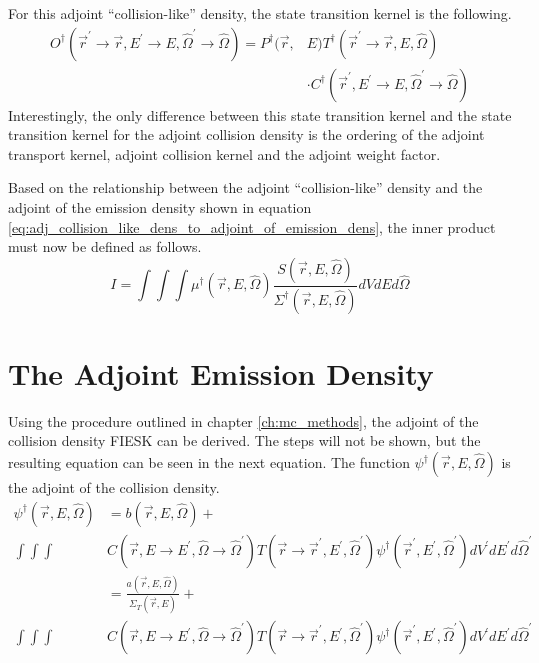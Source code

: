 For this adjoint ``collision-like'' density, the state transition kernel is the 
following. 
\begin{equation}
  \begin{split}
    O^{\dagger}(\vec{r}^{'} \to \vec{r},E^{'} \to E,\hat{\Omega}^{'} \to \hat{\Omega})
    = P^{\dagger}(\vec{r},&E) 
    T^{\dagger}(\vec{r}^{'} \to \vec{r},E,\hat{\Omega}) \\
    & \cdot C^{\dagger}(\vec{r}^{'},E^{'} \to E,\hat{\Omega}^{'} \to \hat{\Omega})
  \end{split}
\end{equation}
Interestingly, the only difference between this state transition
kernel and the state transition kernel for the adjoint collision density is
the ordering of the adjoint transport kernel, adjoint collision kernel and the
adjoint weight factor.

Based on the relationship between the adjoint ``collision-like'' density and the
adjoint of the emission density shown in equation 
\ref{eq:adj_collision_like_dens_to_adjoint_of_emission_dens}, the inner product
must now be defined as follows.
\begin{equation}
  I = \int\int\int \mu^{\dagger}(\vec{r},E,\hat{\Omega})
  \frac{S(\vec{r},E,\hat{\Omega})}{\Sigma^{\dagger}(\vec{r},E,\hat{\Omega})}
  dV dE d\hat{\Omega}
\end{equation}

\section{The Adjoint Emission Density}
Using the procedure outlined in chapter \ref{ch:mc_methods}, the adjoint of the
collision density FIESK can be derived. The steps will not be shown, but the 
resulting equation can be seen in the next equation. The function 
$\psi^{\dagger}(\vec{r},E,\hat{\Omega})$ is the adjoint of the collision density.
\begin{align}
  \psi^{\dagger}(\vec{r},E,\hat{\Omega}) & = b(\vec{r},E,\hat{\Omega}) + 
  \nonumber \\
  \int\int\int &C(\vec{r},E \to E^{'},\hat{\Omega} \to \hat{\Omega}^{'})
  T(\vec{r} \to \vec{r}^{'},E^{'},\hat{\Omega}^{'})
  \psi^{\dagger}(\vec{r}^{'},E^{'},\hat{\Omega}^{'}) dV^{'}dE^{'}d\hat{\Omega}^{'}
  \nonumber \\
   & = \frac{a(\vec{r},E,\hat{\Omega})}
            {\Sigma_T(\vec{r},E)}+ \nonumber \\
   \int\int\int & C(\vec{r},E \to E^{'},\hat{\Omega} \to \hat{\Omega}^{'})
   T(\vec{r} \to \vec{r}^{'},E^{'},\hat{\Omega}^{'})
   \psi^{\dagger}(\vec{r}^{'},E^{'},\hat{\Omega}^{'}) dV^{'}dE^{'}d\hat{\Omega}^{'}
   \nonumber
\end{align}

